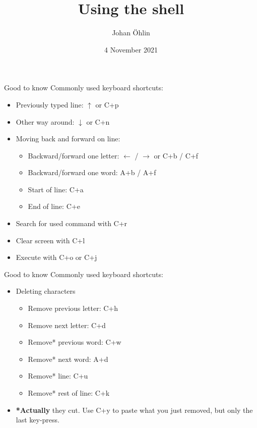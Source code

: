 \documentclass{beamer}
\title{Using the shell}
\date{4 November 2021}
\author{Johan Öhlin}
\institute{Yabs}
\let\bf\textbf
\begin{document}
\maketitle

\begin{frame}{Good to know}
        Commonly used keyboard shortcuts: \\
        \begin{itemize}
                \item Previously typed line: $\uparrow$ or C+p
                \item Other way around: $\downarrow$ or C+n
                \item Moving back and forward on line:
                        \begin{itemize}
                                \item Backward/forward one letter: $\leftarrow$ / $\rightarrow$ or C+b / C+f
                                \item Backward/forward one word: A+b / A+f
                                \item Start of line: C+a
                                \item End of line: C+e
                        \end{itemize}
                \item Search for used command with C+r
                \item Clear screen with C+l
                \item Execute with C+o or C+j
        \end{itemize}
\end{frame}

\begin{frame}{Good to know}
        Commonly used keyboard shortcuts: \\
        \begin{itemize}
                \item Deleting characters
                        \begin{itemize}
                                \item Remove previous letter: C+h
                                \item Remove next letter: C+d
                                \item Remove* previous word: C+w
                                \item Remove* next word: A+d
                                \item Remove* line: C+u
                                \item Remove* rest of line: C+k
                        \end{itemize}
                \item \bf{*Actually} they cut. Use C+y to paste what you just removed, but only the last key-press.
        \end{itemize}
\end{frame}
\end{document}
